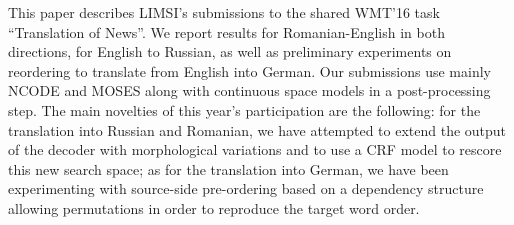 This paper describes LIMSI's submissions to the shared WMT'16 task ``Translation of News''. We report results for Romanian-English in both directions, for English to Russian, as well as preliminary experiments on reordering to translate from English into German. Our submissions use mainly NCODE and MOSES along with continuous space models in a post-processing step. The main novelties of this year's participation are the following: for the translation into Russian and Romanian, we have attempted to extend the output of the decoder with morphological variations and to use a CRF model to rescore this new search space; as for the translation into German, we have been experimenting with source-side pre-ordering based on a dependency structure allowing permutations in order to reproduce the target word order.

